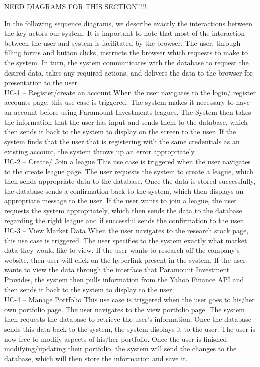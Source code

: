 NEED DIAGRAMS FOR THIS SECTION!!!!!



In the following sequence diagrams, we describe exactly the interactions between the key
actors our system. It is important to note that most of the interaction between the
user and system is facilitated by the browser. The user, through filling forms and button
clicks, instructs the browser which requests to make to the system.
In turn, the system communicates with the database to request the desired data,
takes any required actions, and delivers the data to the browser for presentation to the user. \\


UC-1 – Register/create an account
When the user navigates to the login/ register accounts page, this use case
is triggered. The system makes it necessary to have an account before using
Paramount Investments leagues. The System then takes the information that the
user has input and sends them to the database, which then sends it back to the
system to display on the screen to the user. If the system finds that the user that is
registering with the same credentials as an existing account, the system throws up
an error appropriately.\\

UC-2 – Create/ Join a league
This use case is triggered when the user navigates to the create league page.
The user requests the system to create a league, which then sends appropriate
data to the database. Once the data is stored successfully, the database sends a
confirmation back to the system, which then displays an appropriate message to the
user. If the user wants to join a league, the user requests the system appropriately,
which then sends the data to the database regarding the right league and if
successful sends the confirmation to the user.\\

UC-3 – View Market Data
When the user navigates to the research stock page, this use case is triggered. The
user specifies to the system exactly what market data they would like to view. If
the user wants to research off the company’s website, then user will click on the
hyperlink present in the system. If the user wants to view the data through the
interface that Paramount Investment Provides, the system then pulls information
from the Yahoo Finance API and then sends it back to the system to display to the
user.\\

UC-4 – Manage Portfolio
This use case is triggered when the user goes to his/her own portfolio page. The
user navigates to the view portfolio page. The system then requests the database
to retrieve the user’s information. Once the database sends this data back to the
system, the system displays it to the user. The user is now free to modify aspects of
his/her portfolio. Once the user is finished modifying/updating their portfolio, the
system will send the changes to the database, which will then store the information
and save it.\\

